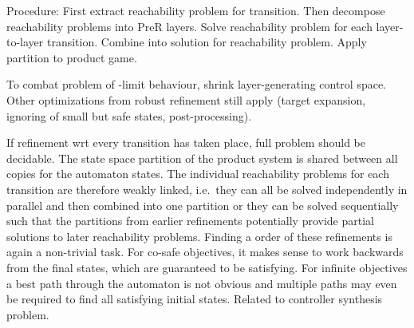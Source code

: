     Procedure:
    First extract reachability problem for transition.
    Then decompose reachability problems into PreR layers. %
    Solve reachability problem for each layer-to-layer transition.
    Combine into solution for reachability problem.
    Apply partition to product game.

    To combat problem of \epsilon-limit behaviour, shrink layer-generating control space.
    Other optimizations from robust refinement still apply (target expansion, ignoring of small but safe states, post-processing).

\stopsubsection


\startsubsection[title={Transition Selection},reference=refinement-transition-selection]

    If refinement wrt every transition has taken place, full problem should be decidable.
    The state space partition of the product system is shared between all copies for the automaton states.
    The individual reachability problems for each transition are therefore weakly linked, i.e.\ they can all be solved independently in parallel and then combined into one partition or they can be solved sequentially such that the partitions from earlier refinements potentially provide partial solutions to later reachability problems.
    Finding a  order of these refinements is again a non-trivial task.
    For co-safe objectives, it makes sense to work backwards from the final states, which are guaranteed to be satisfying.
    For infinite objectives a best path through the automaton is not obvious and multiple paths may even be required to find all satisfying initial states.
    Related to controller synthesis problem.

\stopsubsection

